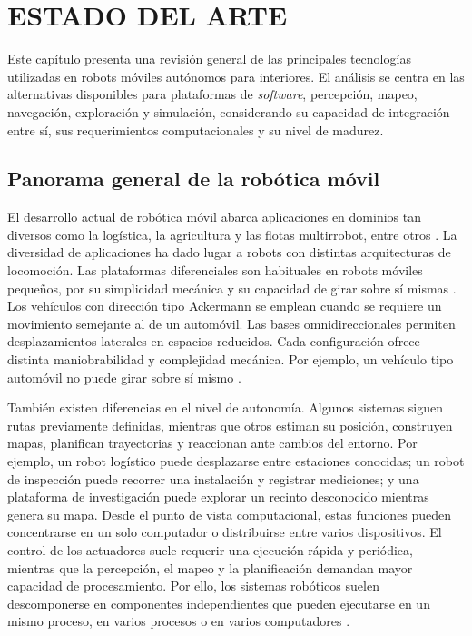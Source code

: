 \chapter{ESTADO DEL ARTE}
\label{ch:estado_arte}

Este capítulo presenta una revisión general de las principales tecnologías
utilizadas en robots móviles autónomos para interiores. El análisis se centra
en las alternativas disponibles para plataformas de \textit{software}, percepción,
mapeo, navegación, exploración y simulación, considerando su capacidad de
integración entre sí, sus requerimientos computacionales y su nivel de
madurez.

\section{Panorama general de la robótica móvil}
\label{sec:panorama_robotica_movil}

El desarrollo actual de robótica móvil abarca aplicaciones en dominios tan diversos como la logística, la agricultura y las flotas multirrobot, entre otros \citep{macenski2023desks}. La diversidad de aplicaciones ha dado lugar a
robots con distintas arquitecturas de locomoción. Las plataformas diferenciales son habituales en robots móviles pequeños, por su simplicidad mecánica y su capacidad de girar sobre sí mismas \parencites[Sec.~4.1]{corke2023}{ferreira2023differential}. Los
vehículos con dirección tipo Ackermann se emplean cuando se requiere un
movimiento semejante al de un automóvil. Las bases omnidireccionales
permiten desplazamientos laterales en espacios reducidos. Cada configuración ofrece
distinta maniobrabilidad y complejidad mecánica. Por ejemplo, un vehículo tipo
automóvil no puede girar sobre sí mismo \citep[Sec.~4.1]{corke2023}.

También existen diferencias en el nivel de autonomía. Algunos sistemas siguen
rutas previamente definidas, mientras que otros estiman su posición,
construyen mapas, planifican trayectorias y reaccionan ante cambios del
entorno. Por ejemplo, un robot logístico puede desplazarse entre estaciones
conocidas; un robot de inspección puede recorrer una instalación y registrar
mediciones; y una plataforma de investigación puede explorar un recinto
desconocido mientras genera su mapa.
Desde el punto de vista computacional, estas funciones pueden concentrarse en
un solo computador o distribuirse entre varios dispositivos. El control de
los actuadores suele requerir una ejecución rápida y periódica, mientras que
la percepción, el mapeo y la planificación demandan mayor capacidad de
procesamiento. Por ello, los sistemas robóticos suelen descomponerse en componentes
independientes que pueden ejecutarse en un mismo proceso, en varios procesos o en
varios computadores \citep{macenski2022ros2}.


